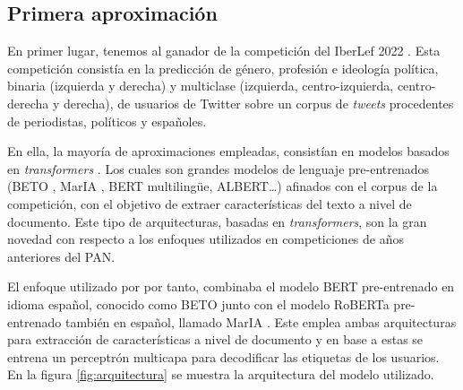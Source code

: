 \subsection{Primera aproximación}
\label{subsec:1aprox}

En primer lugar, tenemos al ganador de la competición del IberLef 2022 \citep{iberlef2022}. Esta competición consistía en la predicción de género, profesión e ideología política, binaria (izquierda y derecha) y multiclase (izquierda, centro-izquierda, centro-derecha y derecha), de usuarios de Twitter sobre un corpus de \textit{tweets} procedentes de periodistas, políticos y españoles.

En ella, la mayoría de aproximaciones empleadas, consistían en modelos basados en \textit{transformers} \citep{vaswani2017attention}. Los cuales son grandes modelos de lenguaje pre-entrenados (BETO \citep{BETO}, MarIA \citep{MarIA}, BERT multilingüe, ALBERT\dots) afinados con el corpus de la competición, con el objetivo de extraer características del texto a nivel de documento. Este tipo de arquitecturas, basadas en \textit{transformers}, son la gran novedad con respecto a los enfoques utilizados en competiciones de años anteriores del PAN.


El enfoque utilizado por \citet{loscalis22} por tanto, combinaba el modelo BERT \citep{devlin2019bert} pre-entrenado en idioma español, conocido como BETO \citep{BETO} junto con el modelo RoBERTa pre-entrenado también en español, llamado MarIA \citep{MarIA}. Este emplea ambas arquitecturas para extracción de características a nivel de documento y en base a estas se entrena un perceptrón multicapa para decodificar las etiquetas de los usuarios. En la figura \ref{fig:arquitectura} se muestra la arquitectura del modelo utilizado.

